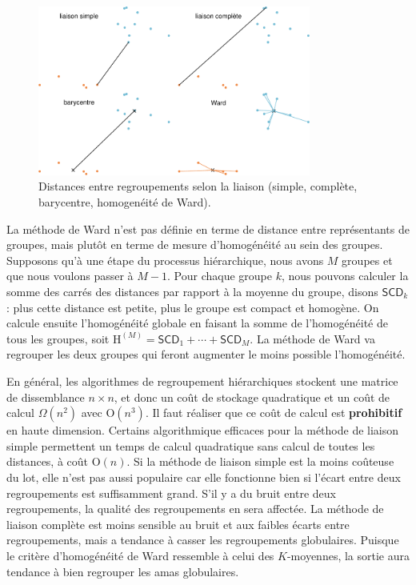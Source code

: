 \documentclass[
  11pt,
  letterpaper,
]{book}
\theoremstyle{definition}
\theoremstyle{remark}
\begin{document}
\begin{figure}[ht!]

{\centering \includegraphics[width=0.8\textwidth,height=\textheight]{./03-regroupements_files/figure-pdf/fig-distances-1.pdf}

}

\caption{\label{fig-distances}Distances entre regroupements selon la
liaison (simple, complète, barycentre, homogenéité de Ward).}

\end{figure}

La méthode de Ward n'est pas définie en terme de distance entre
représentants de groupes, mais plutôt en terme de mesure d'homogénéité
au sein des groupes. Supposons qu'à une étape du processus hiérarchique,
nous avons \(M\) groupes et que nous voulons passer à \(M-1\). Pour
chaque groupe \(k\), nous pouvons calculer la somme des carrés des
distances par rapport à la moyenne du groupe, disons \(\mathsf{SCD}_k\):
plus cette distance est petite, plus le groupe est compact et homogène.
On calcule ensuite l'homogénéité globale en faisant la somme de
l'homogénéité de tous les groupes, soit
\(\mathrm{H}^{(M)} = \mathsf{SCD}_1 + \cdots + \mathsf{SCD}_M\). La
méthode de Ward va regrouper les deux groupes qui feront augmenter le
moins possible l'homogénéité.

En général, les algorithmes de regroupement hiérarchiques stockent une
matrice de dissemblance \(n \times n\), et donc un coût de stockage
quadratique et un coût de calcul \(\Omega(n^2)\) avec
\(\mathrm{O}(n^3)\). Il faut réaliser que ce coût de calcul est
\textbf{prohibitif} en haute dimension. Certains algorithmique efficaces
pour la méthode de liaison simple permettent un temps de calcul
quadratique sans calcul de toutes les distances, à coût
\(\mathrm{O}(n)\). Si la méthode de liaison simple est la moins coûteuse
du lot, elle n'est pas aussi populaire car elle fonctionne bien si
l'écart entre deux regroupements est suffisamment grand. S'il y a du
bruit entre deux regroupements, la qualité des regroupements en sera
affectée. La méthode de liaison complète est moins sensible au bruit et
aux faibles écarts entre regroupements, mais a tendance à casser les
regroupements globulaires. Puisque le critère d'homogénéité de Ward
ressemble à celui des \(K\)-moyennes, la sortie aura tendance à bien
regrouper les amas globulaires.
\end{document}
